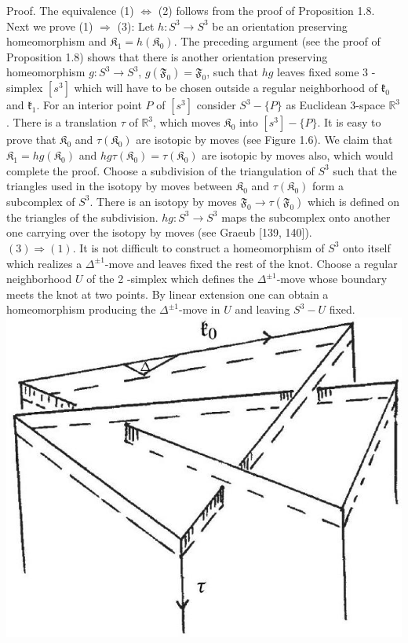 \documentclass[10pt, letterpaper]{article}
\begin{document}
Proof. The equivalence (1) $\Longleftrightarrow$ (2) follows from the proof of Proposition 1.8.\\
Next we prove (1) $\Longrightarrow$ (3): Let $h: S^{3} \rightarrow S^{3}$ be an orientation preserving homeomorphism and $\mathfrak{K}_{1}=h\left(\mathfrak{K}_{0}\right)$. The preceding argument (see the proof of Proposition 1.8) shows that there is another orientation preserving homeomorphism $g: S^{3} \rightarrow S^{3}$, $g\left(\mathfrak{F}_{0}\right)=\mathfrak{F}_{0}$, such that $h g$ leaves fixed some 3 -simplex $\left[s^{3}\right]$ which will have to be chosen outside a regular neighborhood of $\mathfrak{k}_{0}$ and $\mathfrak{k}_{1}$. For an interior point $P$ of $\left[s^{3}\right]$ consider $S^{3}-\{P\}$ as Euclidean 3-space $\mathbb{R}^{3}$. There is a translation $\tau$ of $\mathbb{R}^{3}$, which moves $\mathfrak{K}_{0}$ into $\left[s^{3}\right]-\{P\}$. It is easy to prove that $\mathfrak{K}_{0}$ and $\tau\left(\mathfrak{K}_{0}\right)$ are isotopic by moves (see Figure 1.6). We claim that $\mathfrak{K}_{1}=h g\left(\mathfrak{K}_{0}\right)$ and $h g \tau\left(\mathfrak{K}_{0}\right)=\tau\left(\mathfrak{K}_{0}\right)$ are isotopic by moves also, which would complete the proof. Choose a subdivision of the triangulation of $S^{3}$ such that the triangles used in the isotopy by moves between $\mathfrak{K}_{0}$ and $\tau\left(\mathfrak{K}_{0}\right)$ form a subcomplex of $S^{3}$. There is an isotopy by moves $\mathfrak{F}_{0} \rightarrow \tau\left(\mathfrak{F}_{0}\right)$ which is defined on the triangles of the subdivision. $h g: S^{3} \rightarrow S^{3}$ maps the subcomplex onto another one carrying over the isotopy by moves (see Graeub [139, 140]).\\
$(3) \Longrightarrow(1)$. It is not difficult to construct a homeomorphism of $S^{3}$ onto itself which realizes a $\Delta^{ \pm 1}$-move and leaves fixed the rest of the knot. Choose a regular neighborhood $U$ of the 2 -simplex which defines the $\Delta^{ \pm 1}$-move whose boundary meets the knot at two points. By linear extension one can obtain a homeomorphism producing the $\Delta^{ \pm 1}$-move in $U$ and leaving $S^{3}-U$ fixed.\\
\includegraphics[scale=0.2, center]{2025_05_21_9c06be8de7a55410f8c1g-022}
\end{document}
